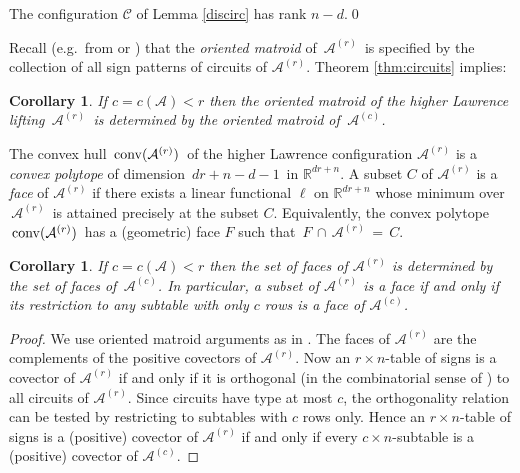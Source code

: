 \documentclass[11pt]{amsart}
\newtheorem{corollary}[theorem]{Corollary}
\theoremstyle{definition}
\newcommand{\reals}{{\mathbb R}}
\newcommand{\C}{{\mathcal C}}
\renewcommand{\L}{{\mathcal L}}
\newcommand{\A}{{\mathcal A}}
\begin{document}
The configuration $\C$ of Lemma \ref{discirc} has rank $n-d$.\qed


\medskip

Recall (e.g.~from \cite{OMbook} or \cite{Ziegler}) that
the {\em oriented matroid} of $\,\A^{(r)}\,$
is specified by the collection of all sign patterns
of circuits of $\A^{(r)}$.
Theorem \ref{thm:circuits} implies:

\begin{corollary}
If $c = c(\A) < r $ then the oriented matroid
of the higher Lawrence lifting  $\, \A^{(r)}\,$
is determined by the oriented matroid of $\, \A^{(c)}$.
\end{corollary}


The convex hull $\, {\rm conv}(\A^{(r)})\,$
of the higher Lawrence configuration
$\A^{(r)}$ is a {\em convex polytope}
of dimension $\,dr+n-d-1 \,$
in $\reals^{dr+n}$. A subset $C$ of $\A^{(r)}$
is a {\em face} of $\A^{(r)}$
if there exists a linear functional $\ell$
on $\reals^{dr+n}$ whose minimum over
$\,\A^{(r)} \,$ is attained precisely at the subset $C$.
Equivalently, the convex polytope $\, {\rm conv}(\A^{(r)})\,$
has a (geometric) face $F$ such that
$\, F \, \cap \, \A^{(r)}\,= \, C$.

\begin{corollary}
If $c = c(\A) < r $ then the set of faces of
$\A^{(r)}$ is determined by the set of faces of
$\,\A^{(c)}$.
In particular, a subset of $\A^{(r)}$ is a  face if and
only if its restriction to any
subtable with only $c$ rows is a  face of $\A^{(c)}$.
\end{corollary}

\begin{proof}
We use oriented matroid arguments as in \cite[\S 9]{OMbook}.
The faces of $\A^{(r)}$ are the complements
of the positive covectors of $\A^{(r)}$. Now an $r \times n$-table
of signs is a covector of $\A^{(r)}$ if and only if it is
orthogonal (in the combinatorial sense of \cite[\S 3]{OMbook})
  to all circuits of $\A^{(r)}$.
Since circuits have type at most $c$, the orthogonality relation
can be tested by restricting to subtables with $c$ rows only.
Hence an $r \times n$-table of signs is a (positive) covector
of $\A^{(r)}$ if and only if
every $c \times n$-subtable is  a (positive) covector
of $\A^{(c)}$.
\end{proof}
\end{document}
